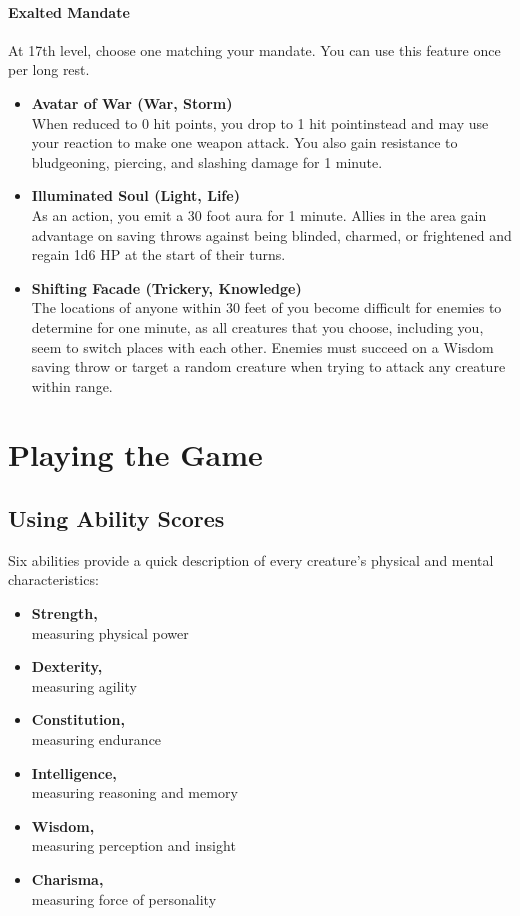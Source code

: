 \paragraph{Exalted Mandate}\label{Sacred_Mandate_exalted-mandate}

At 17th level, choose one matching your mandate. You can use this
feature once per long rest.

\begin{itemize}
\item
  \textbf{Avatar of War (War, Storm)}\\
  When reduced to 0 hit points, you drop to 1 hit pointinstead and may
  use your reaction to make one weapon attack. You also gain resistance
  to bludgeoning, piercing, and slashing damage for 1 minute.
\item
  \textbf{Illuminated Soul (Light, Life)}\\
  As an action, you emit a 30 foot aura for 1 minute. Allies in the area
  gain advantage on saving throws against being blinded, charmed, or
  frightened and regain 1d6 HP at the start of their turns.
\item
  \textbf{Shifting Facade (Trickery, Knowledge)}\\
  The locations of anyone within 30 feet of you become difficult for
  enemies to determine for one minute, as all creatures that you choose,
  including you, seem to switch places with each other. Enemies must
  succeed on a Wisdom saving throw or target a random creature when
  trying to attack any creature within range.
\end{itemize}

\section{Playing the Game}\label{PlayersGuide_playing-the-game}

\subsection{Using Ability
Scores}\label{Using_Ability_Scores_using-ability-scores}

Six abilities provide a quick description of every creature's physical
and mental characteristics:

\begin{itemize}
\item
  \textbf{Strength,}\\
  measuring physical power
\item
  \textbf{Dexterity,}\\
  measuring agility
\item
  \textbf{Constitution,}\\
  measuring endurance
\item
  \textbf{Intelligence,}\\
  measuring reasoning and memory
\item
  \textbf{Wisdom,}\\
  measuring perception and insight
\item
  \textbf{Charisma,}\\
  measuring force of personality
\end{itemize}

